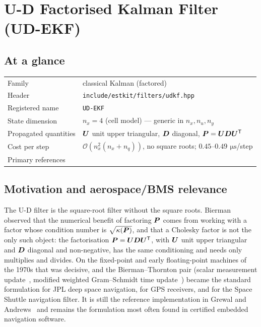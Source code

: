 \chapter{U-D Factorised Kalman Filter (UD-EKF)}
\label{ch:udekf}

\section*{At a glance}
\begin{tabular}{@{}l>{\raggedright\arraybackslash}p{}@{}}
Family & classical Kalman (factored) \\
Header & \texttt{include/estkit/filters/udkf.hpp} \\
Registered name & \texttt{UD-EKF} \\
State dimension & $n_x = 4$ (cell model) --- generic in $n_x, n_u, n_y$ \\
Propagated quantities & $\bm{U}$ unit upper triangular, $\bm{D}$ diagonal, $\bm{P} = \bm{U}\bm{D}\bm{U}^{\mathsf{T}}$ \\
Cost per step & $\mathcal{O}(n_x^2(n_x{+}n_q))$, no square roots; $0.45$--$0.49\,\SI{}{\micro\second}$/step \\
Primary references & \cite{bierman1977,thornton1976ud,kaminski1971,grewal2014,verhaegen1986} \\
\end{tabular}

\section{Motivation and aerospace/BMS relevance}
The U-D filter is the square-root filter without the square roots. Bierman observed that the
numerical benefit of factoring $\bm{P}$ comes from working with a factor whose condition number
is $\sqrt{\kappa(\bm{P})}$, and that a Cholesky factor is not the only such object: the
factorisation $\bm{P} = \bm{U}\bm{D}\bm{U}^{\mathsf{T}}$, with $\bm{U}$ unit upper triangular and $\bm{D}$ diagonal and
non-negative, has the same conditioning and needs only multiplies and divides. On the
fixed-point and early floating-point machines of the 1970s that was decisive, and the
Bierman--Thornton pair (scalar measurement update~\cite[Ch.~V]{bierman1977}, modified weighted
Gram--Schmidt time update~\cite{thornton1976ud}) became the standard formulation for JPL deep
space navigation, for GPS receivers, and for the Space Shuttle navigation filter. It is still
the reference implementation in Grewal and Andrews~\cite{grewal2014} and remains the
formulation most often found in certified embedded navigation software.

